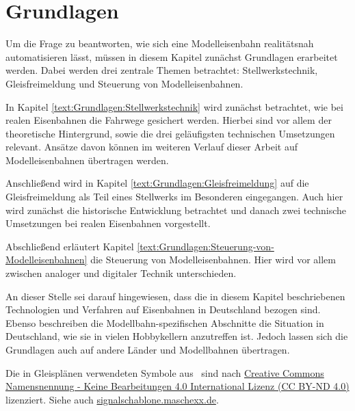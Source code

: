 \chapter{Grundlagen}\label{text:Grundlagen}

Um die Frage zu beantworten, wie sich eine Modelleisenbahn realitätsnah automatisieren lässt, müssen in diesem Kapitel zunächst Grundlagen erarbeitet werden. Dabei werden drei zentrale Themen betrachtet: Stellwerkstechnik, Gleisfreimeldung und Steuerung von Modelleisenbahnen.

In Kapitel \autoref{text:Grundlagen:Stellwerkstechnik}  wird zunächst betrachtet, wie bei realen Eisenbahnen die Fahrwege gesichert werden. Hierbei sind vor allem der theoretische Hintergrund, sowie die drei geläufigsten technischen Umsetzungen relevant. Ansätze davon können im weiteren Verlauf dieser Arbeit auf Modelleisenbahnen übertragen werden.

Anschließend wird in Kapitel \autoref{text:Grundlagen:Gleisfreimeldung}  auf die Gleisfreimeldung als Teil eines Stellwerks im Besonderen eingegangen. Auch hier wird zunächst die historische Entwicklung betrachtet und danach zwei technische Umsetzungen bei realen Eisenbahnen vorgestellt.

Abschließend erläutert Kapitel \autoref{text:Grundlagen:Steuerung-von-Modelleisenbahnen}  die Steuerung von Modelleisenbahnen. Hier wird vor allem zwischen analoger und digitaler Technik unterschieden.

An dieser Stelle sei darauf hingewiesen, dass die in diesem Kapitel beschriebenen Technologien und Verfahren auf Eisenbahnen in Deutschland bezogen sind. Ebenso beschreiben die Modellbahn-spezifischen Abschnitte die Situation in Deutschland, wie sie in vielen Hobbykellern anzutreffen ist. Jedoch lassen sich die Grundlagen auch auf andere Länder und Modellbahnen übertragen.

Die in Gleisplänen verwendeten Symbole aus~\cite{bib:Signalschablone} sind nach \href{https://creativecommons.org/licenses/by-nd/4.0/deed.de}{Creative Commons Namensnennung - Keine Bearbeitungen 4.0 International Lizenz (CC BY-ND 4.0)} lizenziert. Siehe auch \url{signalschablone.maschexx.de}.




